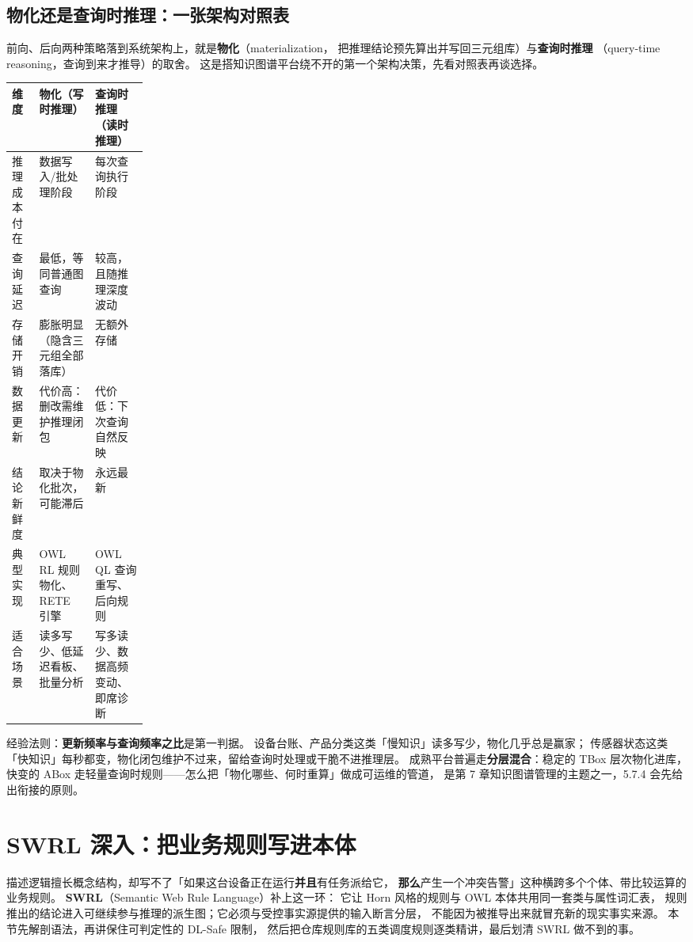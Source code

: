 \subsection{物化还是查询时推理：一张架构对照表}

前向、后向两种策略落到系统架构上，就是\textbf{物化}（materialization，
把推理结论预先算出并写回三元组库）与\textbf{查询时推理}
（query-time reasoning，查询到来才推导）的取舍。
这是搭知识图谱平台绕不开的第一个架构决策，先看对照表再谈选择。

\begin{center}
\begin{tabularx}{\linewidth}{@{}p{0.20\linewidth}XX@{}}
\toprule
\textbf{维度} & \textbf{物化（写时推理）} & \textbf{查询时推理（读时推理）} \\
\midrule
推理成本付在 & 数据写入/批处理阶段 & 每次查询执行阶段 \\
查询延迟 & 最低，等同普通图查询 & 较高，且随推理深度波动 \\
存储开销 & 膨胀明显（隐含三元组全部落库） & 无额外存储 \\
数据更新 & 代价高：删改需维护推理闭包 & 代价低：下次查询自然反映 \\
结论新鲜度 & 取决于物化批次，可能滞后 & 永远最新 \\
典型实现 & OWL RL 规则物化、RETE 引擎 & OWL QL 查询重写、后向规则 \\
适合场景 & 读多写少、低延迟看板、批量分析 & 写多读少、数据高频变动、即席诊断 \\
\bottomrule
\end{tabularx}
\end{center}

经验法则：\textbf{更新频率与查询频率之比}是第一判据。
设备台账、产品分类这类「慢知识」读多写少，物化几乎总是赢家；
传感器状态这类「快知识」每秒都变，物化闭包维护不过来，留给查询时处理或干脆不进推理层。
成熟平台普遍走\textbf{分层混合}：稳定的 TBox 层次物化进库，
快变的 ABox 走轻量查询时规则——怎么把「物化哪些、何时重算」做成可运维的管道，
是第 7 章知识图谱管理的主题之一，5.7.4 会先给出衔接的原则。

\section{SWRL 深入：把业务规则写进本体}

描述逻辑擅长概念结构，却写不了「如果这台设备正在运行\textbf{并且}有任务派给它，
\textbf{那么}产生一个冲突告警」这种横跨多个个体、带比较运算的业务规则。
\textbf{SWRL}（Semantic Web Rule Language）补上这一环：
它让 Horn 风格的规则与 OWL 本体共用同一套类与属性词汇表，
规则推出的结论进入可继续参与推理的派生图；它必须与受控事实源提供的输入断言分层，
不能因为被推导出来就冒充新的现实事实来源。
本节先解剖语法，再讲保住可判定性的 DL-Safe 限制，
然后把仓库规则库的五类调度规则逐类精讲，最后划清 SWRL 做不到的事。

